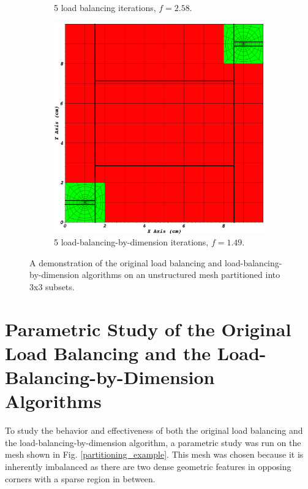 \begin{figure}[H]
\begin{subfigure}[b]{0.49\textwidth}
\caption{5 load balancing iterations, $f = 2.58$.}
\label{3x3_lb}
\end{subfigure}
\begin{subfigure}[b]{0.49\textwidth}
\centering
\includegraphics[scale=0.13]{../figures/ubp_3x3_lbd.png}
\caption{5 load-balancing-by-dimension iterations, $f = 1.49$.}
\label{3x3_lbd}
\end{subfigure}
\caption{A demonstration of the original load balancing and load-balancing-by-dimension algorithms on an unstructured mesh partitioned into 3x3 subsets.}
\label{alg_illustration}
\end{figure}

\section{Parametric Study of the Original Load Balancing and the Load-Balancing-by-Dimension Algorithms}
To study the behavior and effectiveness of both the original load balancing and the load-balancing-by-dimension algorithm, a parametric study was run on the mesh shown in Fig. \ref{partitioning_example}. 
This mesh was chosen because it is inherently imbalanced as there are two dense geometric features in opposing corners with a sparse region in between. 

